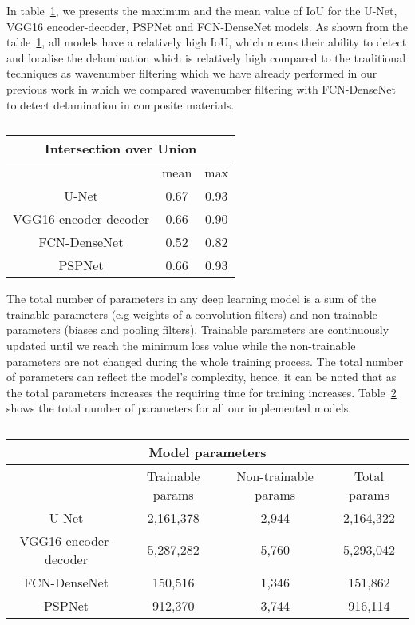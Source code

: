In table~\ref{tab:table_iou}, we presents the maximum and the mean value of IoU for the U-Net, VGG16 encoder-decoder, PSPNet and FCN-DenseNet models.
As shown from the table~\ref{tab:table_iou}, all models have a relatively high IoU, which means their ability to detect and localise the delamination which is relatively high compared to the traditional techniques as wavenumber filtering which we have already performed in our previous work in which we compared wavenumber filtering with FCN-DenseNet to detect delamination in composite materials.
\begin{table}[]
	\centering
	\caption{}
	\label{tab:table_iou}
	\begin{tabular}{ccc}
		\multicolumn{3}{c}{Intersection over Union} \\ \hline
		& mean & max \\ \hline
		U-Net & 0.67 & 0.93 \\ \hline
		VGG16 encoder-decoder & 0.66 & 0.90 \\ \hline
		FCN-DenseNet & 0.52 & 0.82 \\ \hline
		PSPNet & 0.66 & 0.93 \\ \hline
	\end{tabular}
\end{table}

The total number of parameters in any deep learning model is a sum of the trainable parameters (e.g weights of a convolution filters) and non-trainable parameters (biases and  pooling filters).
Trainable parameters are continuously updated until we reach the minimum loss value while the non-trainable parameters are not changed during the whole training process.
The total number of parameters can reflect the model's complexity, hence, it can be noted that as the total parameters increases the requiring time for training increases.
Table~\ref{tab:table_parameters} shows the total number of parameters for all our implemented models.
\begin{table}[]
	\centering
	\caption{}
	\label{tab:table_parameters}
	\resizebox{\textwidth}{!}
	{
		\begin{tabular}{cccc}
			\multicolumn{4}{c}{Model parameters} \\ \hline
			& Trainable params & Non-trainable params & Total params \\ \hline
			U-Net & 2,161,378 & 2,944 & 2,164,322 \\ \hline
			VGG16 encoder-decoder & 5,287,282 & 5,760 & 5,293,042 \\ \hline
			FCN-DenseNet & 150,516 & 1,346 & 151,862 \\ \hline
			PSPNet & 912,370 & 3,744 & 916,114 \\ \hline
		\end{tabular}
	}
\end{table}

\label{section:results_and_discussions}

